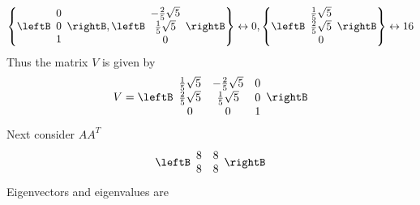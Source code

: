 \begin{equation*}
\left\{ \leftB 
\begin{array}{c}
0 \\ 
0 \\ 
1
\end{array}
\rightB ,\leftB 
\begin{array}{c}
-\frac{2}{5}\sqrt{5} \\ 
\frac{1}{5}\sqrt{5} \\ 
0
\end{array}
\rightB \right\} \leftrightarrow 0,\left\{ \leftB 
\begin{array}{c}
\frac{1}{5}\sqrt{5} \\ 
\frac{2}{5}\sqrt{5} \\ 
0
\end{array}
\rightB \right\} \leftrightarrow 16
\end{equation*}
Thus the matrix $V$ is given by 
\begin{equation*}
V=\leftB 
\begin{array}{ccc}
\frac{1}{5}\sqrt{5} & -\frac{2}{5}\sqrt{5} & 0 \\ 
\frac{2}{5}\sqrt{5} & \frac{1}{5}\sqrt{5} & 0 \\ 
0 & 0 & 1
\end{array}
\rightB
\end{equation*}
Next consider $AA^T$
\begin{equation*}
\leftB 
\begin{array}{cc}
8 & 8 \\ 
8 & 8
\end{array}
\rightB
\end{equation*}
Eigenvectors and eigenvalues are

